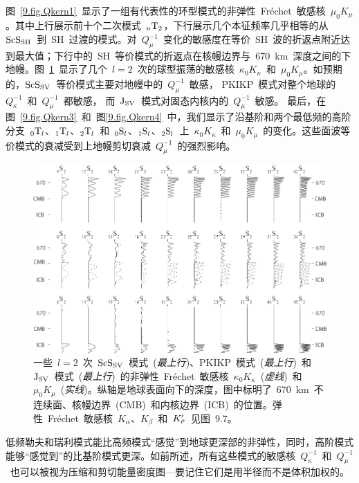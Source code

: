 图~\ref{9.fig.Qkern1}~显示了一组有代表性的环型模式的非弹性~Fr\'{e}chet~敏感核~$\mu_0K_{\mu}$。其中上行展示前十个二次模式~${}_n{\rm T}_2$，下行展示几个本征频率几乎相等的从~${\rm ScS}_{\rm SH}$~到~SH~过渡的模式。对~$Q_{\mu}^{-1}$~变化的敏感度在等价~SH~波的折返点附近达到最大值；下行中的~SH~等价模式的折返点在核幔边界与~670~km~深度之间的下地幔。图~\ref{9.fig.Qkern2}~显示了几个~$l=2$~次的球型振荡的敏感核~$\kappa_0K_{\kappa}$~和~$\mu_0K_{\mu}$。如预期的，${\rm ScS}_{\rm SV}$~等价模式主要对地幔中的~$Q_{\mu}^{-1}$~敏感，
%
%
PKIKP~模式对整个地球的~$Q_{\kappa}^{-1}$~和~$Q_{\mu}^{-1}$~都敏感，
%
%
而~${\rm J}_{\rm SV}$~模式对固态内核内的~$Q_{\mu}^{-1}$~敏感。
%
%
最后，在图~\ref{9.fig.Qkern3}~和~图\ref{9.fig.Qkern4}~中，我们显示了沿基阶和两个最低频的高阶分支~${}_0{\rm T}_l$、${}_1{\rm T}_l$、${}_2{\rm T}_l$~和~${}_0{\rm S}_l$、${}_1{\rm S}_l$、${}_2{\rm S}_l$~上~$\kappa_0K_{\kappa}$~和~$\mu_0K_{\mu}$~的变化。这些面波等价模式的衰减受到上地幔剪切衰减~$Q_{\mu}^{-1}$~的强烈影响。
%
%
\begin{figure}[!t]
\begin{center}
\includegraphics{../figures/chap09/fig13.eps}
\end{center}
\caption[Qkernels2]{\label{9.fig.Qkern2}
一些~$l=2$~次~${\rm ScS}_{\rm SV}$~模式~({\em 最上行\/})、PKIKP~模式~({\em 最上行\/})~和~${\rm J}_{\rm SV}$~模式~({\em 最上行\/})~的非弹性~Fr\'{e}chet~敏感核~$\kappa_0K_{\kappa}$~({\em 虚线\/})~和~$\mu_0K_{\mu}$~({\em 实线\/})。纵轴是地球表面向下的深度，图中标明了~670~km~不连续面、核幔边界~(CMB)~和内核边界~(ICB)~的位置。弹性~Fr\'{e}chet~敏感核~$K_{\alpha}$、$K_{\beta}$~和~$K_{\raisebox{0.3 ex}{\scriptsize$\rho$}}^{\prime}$~见图~9.7。
}
\end{figure}
低频勒夫和瑞利模式能比高频模式“感觉”到地球更深部的非弹性，同时，高阶模式能够“感觉到”的比基阶模式更深。如前所述，所有这些模式的敏感核~$Q_{\kappa}^{-1}$~和~$Q_{\mu}^{-1}$~也可以被视为压缩和剪切能量密度图---要记住它们是用半径而不是体积加权的。

